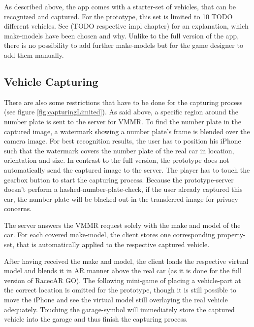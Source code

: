 As described above, the app comes with a starter-set of vehicles, that can be recognized and captured. For the prototype, this set is limited to 10 TODO different vehicles. See (TODO respective impl chapter) for an explanation, which make-models have been chosen and why. Unlike to the full version of the app, there is no possibility to add further make-models but for the game designer to add them manually.

\subsection{Vehicle Capturing}
There are also some restrictions that have to be done for the capturing process (see figure \ref{fig:capturingLimited}). As said above, a specific region around the number plate is sent to the server for VMMR. To find the number plate in the captured image, a watermark showing a number plate's frame is blended over the camera image. For best recognition results, the user has to position his iPhone such that the watermark covers the number plate of the real car in location, orientation and size. In contrast to the full version, the prototype does not automatically send the captured image to the server. The player has to touch the gearbox button to start the capturing process. Because the prototype-server doesn't perform a hashed-number-plate-check, if the user already captured this car, the number plate will be blacked out in the transferred image for privacy concerns.

The server answers the VMMR request solely with the make and model of the car. For each covered make-model, the client stores one corresponding property-set, that is automatically applied to the respective captured vehicle.

After having received the make and model, the client loads the respective virtual model and blends it in AR manner above the real car (as it is done for the full version of RacecAR GO). The following mini-game of placing a vehicle-part at the correct location is omitted for the prototype, though it is still possible to move the iPhone and see the virtual model still overlaying the real vehicle adequately. Touching the garage-symbol will immediately store the captured vehicle into the garage and thus finish the capturing process.

